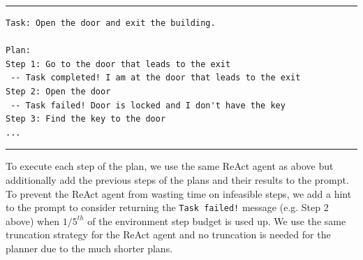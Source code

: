 \rule{\textwidth}{0.5pt}
\begin{footnotesize}
\begin{verbatim}
Task: Open the door and exit the building.

Plan:
Step 1: Go to the door that leads to the exit
 -- Task completed! I am at the door that leads to the exit
Step 2: Open the door
 -- Task failed! Door is locked and I don't have the key
Step 3: Find the key to the door
...
\end{verbatim}
\end{footnotesize}
\rule{\textwidth}{0.5pt}

To execute each step of the plan, we use the same ReAct agent as above but additionally add the previous steps of the plans and their results to the prompt. To prevent the ReAct agent from wasting time on infeasible steps, we add a hint to the prompt to consider returning the \texttt{Task failed!} message (e.g. Step 2 above) when $1/5^{th}$ of the environment step budget is used up. We use the same truncation strategy for the ReAct agent and no truncation is needed for the planner due to the much shorter plans. 


